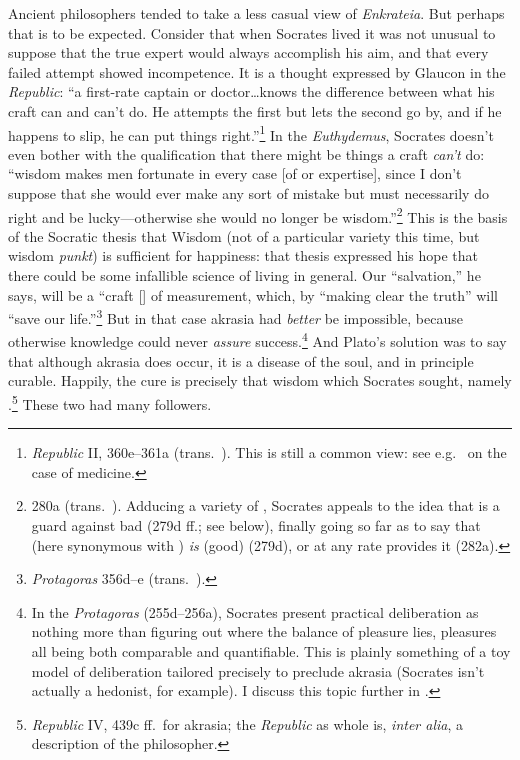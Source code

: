 \documentclass[11pt,letterpaper,oneside]{amsart}
\begin{document}
Ancient philosophers tended to take a less casual view of \emph{Enkrateia}. But perhaps that is to be expected. Consider that when Socrates lived it was not unusual to suppose that the true expert would always accomplish his aim, and that every failed attempt showed incompetence. It is a thought expressed by Glaucon in the \emph{Republic}: ``a first-rate captain or doctor\ldots knows the difference between what his craft can and can't do. He attempts the first but lets the second go by, and if he happens to slip, he can put things right.''\footnote{\emph{Republic} II, 360e--361a (trans.\ ). This is still a common view: see e.g.\ \citet{holden1977needs} on the case of medicine.} In the \emph{Euthydemus}, Socrates doesn't even bother with the qualification that there might be things a craft \emph{can't} do: ``wisdom makes men fortunate in every case [of  or expertise], since I don't suppose that she would ever make any sort of mistake but must necessarily do right and be lucky---otherwise she would no longer be wisdom.''\footnote{280a (trans.\ ). Adducing a variety of , Socrates appeals to the idea that  is a guard against bad  (279d ff.; see below), finally going so far as to say that  (here synonymous with ) \emph{is} (good)  (279d), or at any rate provides it (282a).} This is the basis of the Socratic thesis that Wisdom (not of a particular variety this time, but wisdom \emph{punkt}) is sufficient for happiness: that thesis expressed his hope that there could be some infallible science of living in general. Our ``salvation,'' he says, will be a ``craft [] of measurement, which, by ``making clear the truth'' will ``save our life.''\footnote{\emph{Protagoras} 356d--e (trans.\ ).} But in that case akrasia had \emph{better} be impossible, because otherwise knowledge could never \emph{assure} success.\footnote{In the \emph{Protagoras} (255d--256a), Socrates present practical deliberation as nothing more than figuring out where the balance of pleasure lies, pleasures all being both comparable and quantifiable. This is plainly something of a toy model of deliberation tailored precisely to preclude akrasia (Socrates isn't actually a hedonist, for example). I discuss this topic further in \citet{ritchiesocrates}.} And Plato's solution was to say that although akrasia does occur, it is a disease of the soul, and in principle curable. Happily, the cure is precisely that wisdom which Socrates sought, namely .\footnote{\emph{Republic} IV, 439c ff.\ for akrasia; the \emph{Republic} as whole is, \emph{inter alia}, a description of the philosopher.} These two had many followers.
\end{document}
